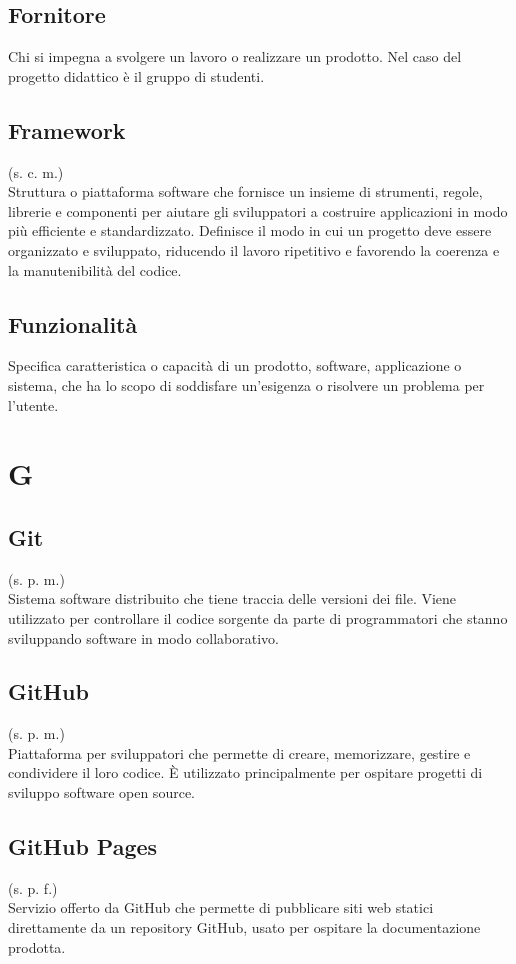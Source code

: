     \subsection{Fornitore}
    Chi si impegna a svolgere un lavoro o realizzare un prodotto. Nel caso del progetto didattico
    è il gruppo di studenti.
    \subsection{Framework}
    (s. c. m.)\\
    Struttura o piattaforma software che fornisce un insieme di strumenti, regole, 
    librerie e componenti per aiutare gli sviluppatori a costruire applicazioni 
    in modo più efficiente e standardizzato. Definisce il modo in cui un progetto 
    deve essere organizzato e sviluppato, riducendo il lavoro ripetitivo e favorendo 
    la coerenza e la manutenibilità del codice.
    \subsection{Funzionalità}
    \label{Funzionalità}
    Specifica caratteristica o capacità di un prodotto, software, applicazione o sistema, 
    che ha lo scopo di soddisfare un'esigenza o risolvere un problema per l'utente.
\pagebreak
\section{G}
    \subsection{Git}
    \label{Git}
    (s. p. m.)\\
    Sistema software distribuito che tiene traccia delle versioni dei file. 
    Viene utilizzato per controllare il codice sorgente da parte di programmatori 
    che stanno sviluppando software in modo collaborativo.
    \subsection{GitHub}
    \label{GitHub}
    (s. p. m.)\\
    Piattaforma per sviluppatori che permette di creare, memorizzare, gestire 
    e condividere il loro codice. È utilizzato principalmente per ospitare 
    progetti di sviluppo software open source.
    \subsection{GitHub Pages}
    \label{GitHub Pages}
    (s. p. f.)\\
    Servizio offerto da GitHub che permette di pubblicare siti web statici direttamente da un repository GitHub,
    usato per ospitare la documentazione prodotta.
